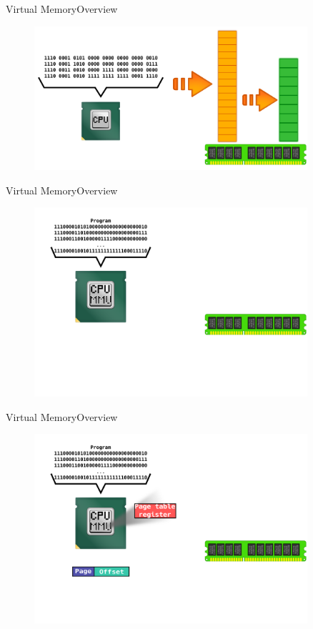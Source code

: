 \documentclass[10pt]{beamer}
\begin{document}
\begin{frame}{Virtual Memory}{Overview}
  \begin{figure}[ht]
    \centering
    \includegraphics[width=0.9\textwidth, keepaspectratio=true]{images/virtual_memory_c.png}
  \end{figure}
\end{frame}

\begin{frame}{Virtual Memory}{Overview}
  \begin{figure}[ht]
    \centering
    \includegraphics[width=0.9\textwidth, keepaspectratio=true]{images/mmu_a.png}
  \end{figure}
\end{frame}

\begin{frame}{Virtual Memory}{Overview}
  \begin{figure}[ht]
    \centering
    \includegraphics[width=0.9\textwidth, keepaspectratio=true]{images/mmu_b.png}
  \end{figure}
\end{frame}
\end{document}
